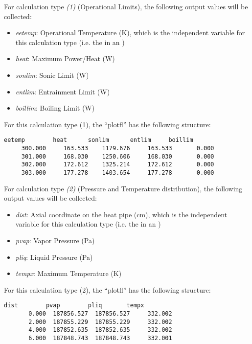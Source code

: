 For calculation type  \textit{(1)} (Operational Limits), the following output values will be collected:
\begin{itemize}
  \item \textit{eetemp}: Operational Temperature (K), which is the independent variable for this calculation type (i.e. the  in an )
  \item \textit{heat}: Maximum Power/Heat (W) 
  \item \textit{sonlim}: Sonic Limit (W)
  \item \textit{entlim}: Entrainment Limit (W)
  \item \textit{boillim}: Boiling Limit (W)
\end{itemize}

For this calculation type (1), the ``plotfl'' has the following structure:
  \begin{lstlisting}[basicstyle=\tiny]
      eetemp        heat      sonlim      entlim     boillim
     300.000     163.533    1179.676     163.533       0.000
     301.000     168.030    1250.606     168.030       0.000
     302.000     172.612    1325.214     172.612       0.000
     303.000     177.278    1403.654     177.278       0.000
\end{lstlisting}

For calculation type  \textit{(2)} (Pressure and Temperature distribution), the following output values will be collected:
\begin{itemize}
  \item \textit{dist}: Axial coordinate on the heat pipe (cm), which is the independent variable for this calculation type (i.e. the  in an )
  \item \textit{pvap}: Vapor Pressure (Pa) 
  \item \textit{pliq}: Liquid Pressure (Pa)
  \item \textit{tempx}: Maximum Temperature (K)
\end{itemize}

For this calculation type (2), the ``plotfl'' has the following structure:
  \begin{lstlisting}[basicstyle=\tiny]
        dist        pvap        pliq       tempx
       0.000  187856.527  187856.527     332.002
       2.000  187855.229  187855.229     332.002
       4.000  187852.635  187852.635     332.002
       6.000  187848.743  187848.743     332.001
\end{lstlisting}

